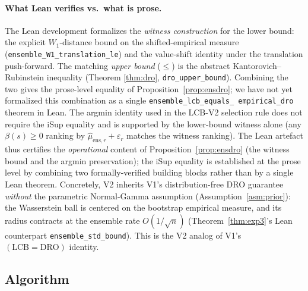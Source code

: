 \documentclass[11pt]{article}
\theoremstyle{definition}
\theoremstyle{remark}
\begin{document}
\paragraph{What Lean verifies vs.\ what is prose.} The Lean development
formalizes the \emph{witness construction} for the lower bound: the
explicit $W_1$-distance bound on the shifted-empirical measure
(\texttt{ensemble\_W1\_translation\_le}) and the value-shift identity
under the translation push-forward. The matching \emph{upper bound}
($\leq$) is the abstract Kantorovich--Rubinstein inequality (Theorem
\ref{thm:dro}, \texttt{dro\_upper\_bound}). Combining the two gives the
prose-level equality of Proposition~\ref{prop:ensdro}; we have not yet
formalized this combination as a single \texttt{ensemble\_lcb\_equals\_
empirical\_dro} theorem in Lean. The argmin identity used in the LCB-V2
selection rule does not require the iSup equality and is supported by
the lower-bound witness alone (any $\beta(s)\geq 0$ ranking by
$\hat\mu_{\mathrm{ens},r}+\varepsilon_r$ matches the witness ranking).
The Lean artefact thus certifies the \emph{operational} content of
Proposition~\ref{prop:ensdro} (the witness bound and the argmin
preservation); the iSup equality is established at the prose level by
combining two formally-verified building blocks rather than by a single
Lean theorem. Concretely, V2 inherits V1's distribution-free
DRO guarantee \emph{without} the parametric Normal-Gamma assumption
(Assumption~\ref{asm:prior}): the Wasserstein ball is centered on the
bootstrap empirical measure, and its radius contracts at the ensemble
rate $O(1/\sqrt{n})$ (Theorem~\ref{thm:exp3}'s Lean counterpart
\texttt{ensemble\_std\_bound}). This is the V2 analog of V1's
$(\mathrm{LCB}=\mathrm{DRO})$ identity.

\subsection{Algorithm}
\end{document}
